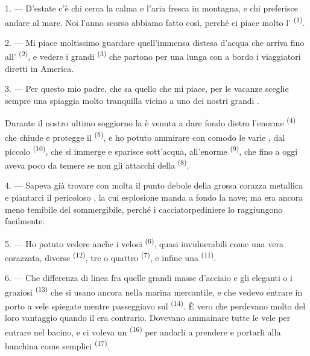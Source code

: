 \VUsaut{4.0mm}
\VUsaut{3.0mm}
\VUsaut{3.0mm}

1. --- D'estate c'è chi cerca la calma e l'aria fresca in montagna, e chi preferisce
andare al mare. Noi l'anno scorso abbiamo fatto così, perché ci piace molto
l' \textsuperscript{(1)}.

2. --- Mi piace moltissimo guardare quell'immensa distesa d'acqua che arriva fino
all' \textsuperscript{(2)}, e vedere i grandi 
\textsuperscript{(3)} che partono per una lunga  con a bordo i
viaggiatori diretti in America.

3. --- Per questo mio padre, che sa quello che mi piace, per le vacanze sceglie sempre
una spiaggia molto tranquilla vicino a uno dei nostri grandi .

Durante il nostro ultimo soggiorno la  è venuta a dare fondo dietro
l'enorme  \textsuperscript{(4)} che chiude e protegge il
 \textsuperscript{(5)}, e ho potuto ammirare con comodo le
varie , dal piccolo 
\textsuperscript{(10)}, che si immerge e sparisce sott'acqua, all'enorme
 \textsuperscript{(9)}, che fino a oggi aveva poco da temere se non
gli attacchi della  \textsuperscript{(8)}.

\VUsaut{3.0mm}
\VUsaut{3.0mm}

4. --- Sapeva già trovare con molta  il punto debole della grossa
corazza metallica e piantarci il pericoloso , la cui esplosione manda a
fondo la nave; ma era ancora meno temibile del sommergibile, perché i cacciatorpediniere
lo raggiungono facilmente.

5. --- Ho potuto vedere anche i veloci 
\textsuperscript{(6)}, quasi invulnerabili come una vera corazzata, diverse
 \textsuperscript{(12)}, tre o quattro 
\textsuperscript{(7)}, e infine una  \textsuperscript{(11)}.

6. --- Che differenza di linea fra quelle grandi masse d'acciaio e gli eleganti
 o i graziosi  \textsuperscript{(13)} che si usano
ancora nella marina mercantile, e che vedevo entrare in porto a vele spiegate mentre
passeggiavo sul  \textsuperscript{(14)}. È vero che perdevano molto del
loro vantaggio quando il  era contrario. Dovevano ammainare tutte le vele
per entrare nel bacino, e ci voleva un  \textsuperscript{(16)} per
andarli a prendere e portarli alla banchina come semplici 
\textsuperscript{(17)}.

